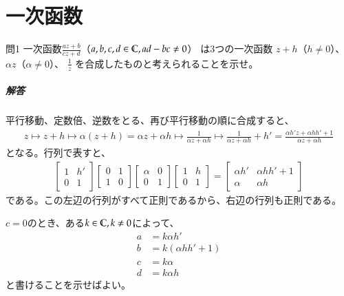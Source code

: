 \chapter{一次函数}%

\begin{mysimplebox}{問1}
    一次函数$\frac{az+b}{cz+d}$（$a,b,c,d\in\mathbb{C},ad-bc\neq0$）
    は3つの一次函数
    $z+h$（$h\neq0$）、
    $\alpha z$（$\alpha\neq0$）、
    $\frac{1}{z}$
    を合成したものと考えられることを示せ。
\end{mysimplebox}
\paragraph{解答}
平行移動、定数倍、逆数をとる、再び平行移動の順に合成すると、
\begin{align*}
    z
    \mapsto z+h
    \mapsto \alpha(z+h)=\alpha z+\alpha h
    \mapsto \frac{1}{\alpha z+\alpha h}
    \mapsto \frac{1}{\alpha z+\alpha h}+h'
    =\frac{\alpha h'z+\alpha hh'+1}{\alpha z+\alpha h}
\end{align*}
となる。行列で表すと、
\begin{align*}
    \begin{bmatrix}
        1&h'\\
        0&1
    \end{bmatrix}
    \begin{bmatrix}
        0&1\\
        1&0
    \end{bmatrix}
    \begin{bmatrix}
        \alpha&0\\
        0&1
    \end{bmatrix}
    \begin{bmatrix}
        1&h\\
        0&1
    \end{bmatrix}
    =\begin{bmatrix}
        \alpha h'&\alpha hh'+1\\
        \alpha&\alpha h
    \end{bmatrix}
\end{align*}
である。この左辺の行列がすべて正則であるから、右辺の行列も正則である。

$c=0$のとき、ある$k\in\mathbb{C},k\neq0$によって、
\begin{align*}
    a&=k\alpha h'\\
    b&=k(\alpha hh'+1)\\
    c&=k\alpha\\
    d&=k\alpha h
\end{align*}
と書けることを示せばよい。

